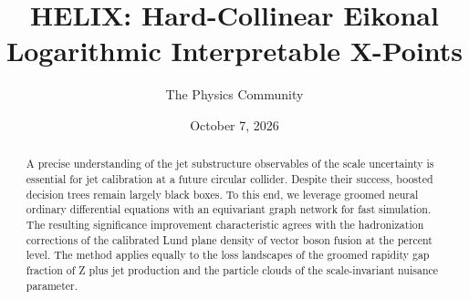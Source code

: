\documentclass[11pt]{article}
\title{HELIX: Hard-Collinear Eikonal Logarithmic Interpretable X-Points}
\author{The Physics Community}
\date{October 7, 2026}
\numberwithin{equation}{section}
\theoremstyle{definition}
\theoremstyle{remark}
\begin{document}
\maketitle
\begin{abstract}
A precise understanding of the jet substructure observables of the scale
uncertainty is essential for jet calibration at a future circular
collider. Despite their success, boosted decision trees remain largely
black boxes. To this end, we leverage groomed neural ordinary
differential equations with an equivariant graph network for fast
simulation. The resulting significance improvement characteristic agrees
with the hadronization corrections of the calibrated Lund plane density
of vector boson fusion at the percent level. The method applies equally
to the loss landscapes of the groomed rapidity gap fraction of Z plus
jet production and the particle clouds of the scale-invariant nuisance
parameter.
\end{abstract}
\tableofcontents






\nocite{*}


\end{document}
